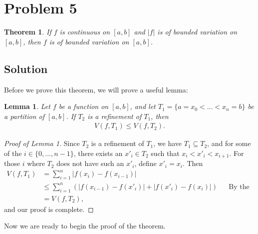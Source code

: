 \documentclass[10pt,a4paper]{article}
\theoremstyle{theorem}
\newtheorem{theorem}{Theorem}
\newtheorem{lemma}{Lemma}
\theoremstyle{definition}
\begin{document}
\section*{Problem 5}
\begin{theorem}
If $f$ is continuous on $[a, b]$ and $|f|$ is of bounded variation on $[a, b]$, then $f$ is of bounded variation on $[a, b]$.
\end{theorem}

\subsection*{Solution}
Before we prove this theorem, we will prove a useful lemma:
\begin{lemma}
Let $f$ be a function on $[a, b]$, and let $T_1 = \{a = x_0 < ... < x_n = b\}$ be a partition of $[a, b]$. If $T_2$ is a refinement of $T_1$, then 
\begin{align*}
V(f, T_1) \leq V(f, T_2).
\end{align*}
\end{lemma}

\begin{proof}[Proof of Lemma 1]
Since $T_2$ is a refinement of $T_1$, we have $T_1 \subseteq T_2$, and for some of the $i \in \{0, ..., n-1\}$, there exists an $x'_i \in T_2$ such that $x_i < x'_i < x_{i+1}$. For those $i$ where $T_2$ does not have such an $x'_i$, define $x'_i = x_i$. Then
\begin{align*}
V(f, T_1) &= \sum_{i=1}^n |f(x_i) - f(x_{i - 1})|\\
&\leq \sum_{i=1}^n \left(|f(x_{i - 1}) - f(x'_i)| + |f(x'_i) - f(x_i)| \right) && \text{By the triangle inequality}\\
&= V(f, T_2),
\end{align*}
and our proof is complete.
\end{proof}

Now we are ready to begin the proof of the theorem.
\end{document}
